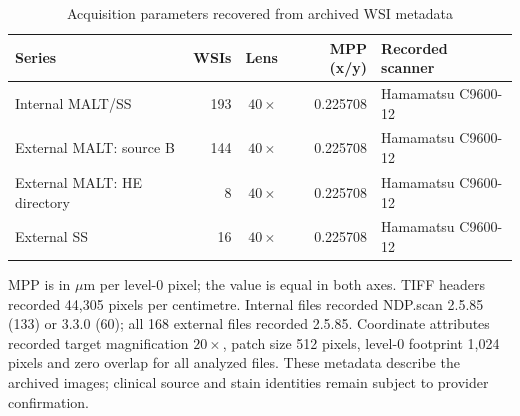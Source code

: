 \clearpage
\begin{table}[H]\centering
\caption{Acquisition parameters recovered from archived WSI metadata}\label{tab:S7}
\small
\begin{tabularx}{\textwidth}{@{}>{\raggedright\arraybackslash}Xrrr>{\raggedright\arraybackslash}p{}@{}}
\toprule
Series & WSIs & Lens & MPP (x/y) & Recorded scanner \\
\midrule
Internal MALT/SS & 193 & $40\times$ & 0.225708 & Hamamatsu C9600-12 \\
External MALT: source B & 144 & $40\times$ & 0.225708 & Hamamatsu C9600-12 \\
External MALT: HE directory & 8 & $40\times$ & 0.225708 & Hamamatsu C9600-12 \\
External SS & 16 & $40\times$ & 0.225708 & Hamamatsu C9600-12 \\
\bottomrule
\end{tabularx}
\par\medskip\footnotesize MPP is in $\mu\mathrm{m}$ per level-0 pixel; the value is equal in both axes. TIFF headers recorded 44,305 pixels per centimetre. Internal files recorded NDP.scan 2.5.85 (133) or 3.3.0 (60); all 168 external files recorded 2.5.85. Coordinate attributes recorded target magnification $20\times$, patch size 512 pixels, level-0 footprint 1,024 pixels and zero overlap for all analyzed files. These metadata describe the archived images; clinical source and stain identities remain subject to provider confirmation.
\end{table}


